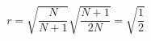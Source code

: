 \begin{displaymath}
r = \sqrt{\frac {N} {N+1}} \sqrt{\frac {N+1} {2N}} = \sqrt{\frac{1}{2}}
\end{displaymath}
